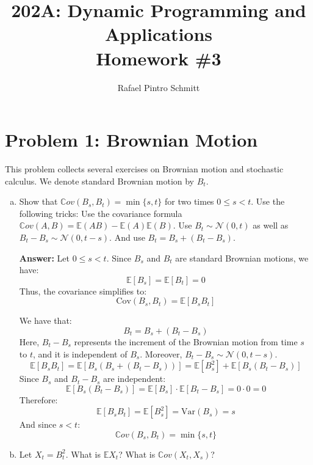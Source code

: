\documentclass[11pt]{extarticle}
\title{202A: Dynamic Programming and Applications\\[5pt] {\Large \textbf{Homework \#3}}}
\author{Rafael Pintro Schmitt}
\date{}
\theoremstyle{plain}
\theoremstyle{definition}
\begin{document}
\maketitle



\section*{Problem 1: Brownian Motion}

This problem collects several exercises on Brownian motion and stochastic calculus. We denote standard Brownian motion by $B_t$.

\begin{enumerate}[(a)]

\item Show that $\mathbb Cov(B_s, B_t) = \min\{s, t\}$ for two times $0 \leq s < t$. Use the following tricks: Use the covariance formula $\mathbb Cov(A, B) = \mathbb E (AB) - \mathbb E(A) \mathbb E(B)$. Use $B_t \sim \mathcal N(0, t)$ as well as $B_t - B_s \sim \mathcal N(0, t-s)$. And use $B_t = B_s + (B_t - B_s)$.

\textbf{Answer:} Let $0\leq s < t$. Since \( B_s \) and \( B_t \) are standard Brownian motions, we have:
\[
\mathbb{E}[B_s] = \mathbb{E}[B_t] = 0
\]
Thus, the covariance simplifies to:
\[
\text{Cov}(B_s, B_t) = \mathbb{E}[B_s B_t]
\]

We have that:
\[
B_t = B_s + (B_t - B_s)
\]
Here, \( B_t - B_s \) represents the increment of the Brownian motion from time \( s \) to \( t \), and it is independent of \( B_s \). Moreover, \( B_t - B_s \sim \mathcal{N}(0, t - s) \).
\[
\mathbb{E}[B_s B_t] = \mathbb{E}\left[ B_s \left( B_s + (B_t - B_s) \right) \right] = \mathbb{E}[B_s^2] + \mathbb{E}[B_s (B_t - B_s)]
\]
Since \( B_s \) and \( B_t - B_s \) are independent:
\[
\mathbb{E}[B_s (B_t - B_s)] = \mathbb{E}[B_s] \cdot \mathbb{E}[B_t - B_s] = 0 \cdot 0 = 0
\]
Therefore:
\[
\mathbb{E}[B_s B_t] = \mathbb{E}[B_s^2] = \text{Var}(B_s) = s
\]
And since $s<t$:
$$\mathbb Cov(B_s, B_t) = \min\{s, t\}$$

\item Let $X_t = B_t^2$. What is $\mathbb E X_t$? What is $\mathbb Cov (X_t, X_s)$?


\end{enumerate}
\end{document}
